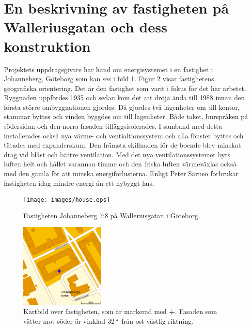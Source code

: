 \section{En beskrivning av fastigheten på Walleriusgatan och dess konstruktion}
\label{subsec:thehouse}




Projektets uppdragsgivare har hand om energisystemet i en fastighet i Johanneberg,
Göteborg som kan ses i bild \ref{fig:thehouse:house}. Figur \ref{fig:thehouse:map}
visar fastighetens geografiska orientering.
Det är den fastighet som varit i fokus för det här arbetet. Byggnaden uppfördes 1935\cite{ritningar_urspr}
och sedan kom det att dröja ända till 1988 innan den första större ombyggnationen gjordes.
Då gjordes två lägenheter om till kontor, stammar byttes och vinden byggdes om till lägenheter.
Både taket, burspråken på södersidan och den norra fasaden tilläggsisolerades.
I samband med detta installerades också nya värme- och ventialtionssystem och alla
fönster byttes och tätades med expanderskum. Den främsta skillnaden för de boende
blev minskat drag vid blåst och bättre ventilation.  Med det nya ventilationssystemet
byts luften helt och hållet varannan timme och den friska luften värmeväxlas också med den gamla för att minska energiförlusterna. Enligt Peter Särneö\cite{petersarneo}
förbrukar fastigheten idag mindre energi än ett nybyggt hus.

\begin{figure}
\centering
\texttt{[image: images/house.eps]}
\caption{Fastigheten Johanneberg 7:8 på Walleriusgatan i Göteborg.}
\label{fig:thehouse:house}
\end{figure}

\begin{figure}
\centering
\includegraphics[width=1.67in,height=1.67in]{images/map.eps}
\caption{Kartbild över fastigheten, som är markerad med \textbf{\color{blue}+}. Fasaden som vätter mot söder är vinklad $\unit[32]{^\circ}$ från
ost-västlig riktning.}
\label{fig:thehouse:map}
\end{figure}

